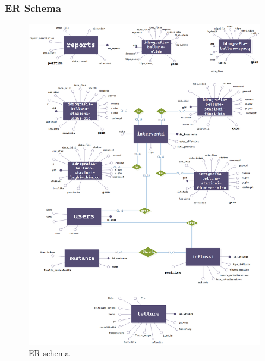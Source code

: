 \subsubsection{ER Schema}
\begin{figure}[H]  \includegraphics[width=0.92\textwidth]{img/ERSchema.png}  \caption{ER schema} \label{er} \end{figure}

